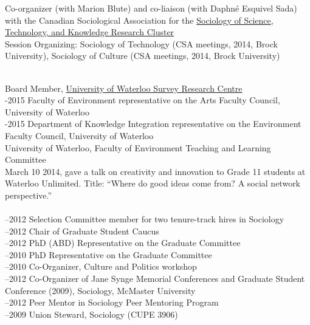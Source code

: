 \documentclass[11pt,usenames,dvipsnames]{article}
\begin{document}
\noindent Co-organizer (with Marion Blute) and co-liaison (with Daphné Esquivel Sada) with the Canadian Sociological Association for the \href{http://www.csa-scs.ca/files/webapps/csapress/sstk/}{Sociology of Science, Technology, and Knowledge Research Cluster}\\

\noindent Session Organizing: Sociology of Technology (CSA meetings, 2014, Brock University), Sociology of Culture (CSA meetings, 2014, Brock University) \\


 \\
 Board Member, \href{http://math.uwaterloo.ca/survey-research-centre/node/1}{University of Waterloo Survey Research Centre}  \\

-2015 Faculty of Environment representative on the Arts Faculty Council, University of Waterloo \\

-2015 Department of Knowledge Integration representative on the Environment Faculty Council, University of Waterloo \\

 University of Waterloo, Faculty of Environment Teaching and Learning Committee \\

\noindent March 10 2014, gave a talk on creativity and innovation to Grade 11 students at Waterloo Unlimited. Title: ``Where do good ideas come from? A social network perspective.'' \\

\\
–2012 Selection Committee member for two tenure-track hires in Sociology\\
–2012 Chair of Graduate Student Caucus\\
–2012 PhD (ABD) Representative on the Graduate Committee\\
–2010 PhD Representative on the Graduate Committee\\
–2010 Co-Organizer, Culture and Politics workshop\\
–2012 Co-Organizer of Jane Synge Memorial Conferences and Graduate Student Conference (2009), Sociology, McMaster University\\
–2012 Peer Mentor in Sociology Peer Mentoring Program\\
–2009 Union Steward, Sociology (CUPE 3906)\\
\end{document}
